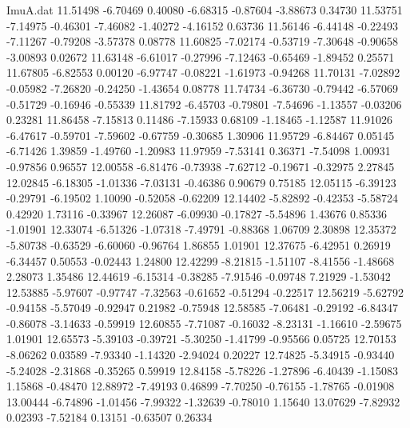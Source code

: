 \begin{filecontents}{ImuA.dat}
  11.51498   -6.70469    0.40080   -6.68315   -0.87604   -3.88673    0.34730
  11.53751   -7.14975   -0.46301   -7.46082   -1.40272   -4.16152    0.63736
  11.56146   -6.44148   -0.22493   -7.11267   -0.79208   -3.57378    0.08778
  11.60825   -7.02174   -0.53719   -7.30648   -0.90658   -3.00893    0.02672
  11.63148   -6.61017   -0.27996   -7.12463   -0.65469   -1.89452    0.25571
  11.67805   -6.82553    0.00120   -6.97747   -0.08221   -1.61973   -0.94268
  11.70131   -7.02892   -0.05982   -7.26820   -0.24250   -1.43654    0.08778
  11.74734   -6.36730   -0.79442   -6.57069   -0.51729   -0.16946   -0.55339
  11.81792   -6.45703   -0.79801   -7.54696   -1.13557   -0.03206    0.23281
  11.86458   -7.15813    0.11486   -7.15933    0.68109   -1.18465   -1.12587
  11.91026   -6.47617   -0.59701   -7.59602   -0.67759   -0.30685    1.30906
  11.95729   -6.84467    0.05145   -6.71426    1.39859   -1.49760   -1.20983
  11.97959   -7.53141    0.36371   -7.54098    1.00931   -0.97856    0.96557
  12.00558   -6.81476   -0.73938   -7.62712   -0.19671   -0.32975    2.27845
  12.02845   -6.18305   -1.01336   -7.03131   -0.46386    0.90679    0.75185
  12.05115   -6.39123   -0.29791   -6.19502    1.10090   -0.52058   -0.62209
  12.14402   -5.82892   -0.42353   -5.58724    0.42920    1.73116   -0.33967
  12.26087   -6.09930   -0.17827   -5.54896    1.43676    0.85336   -1.01901
  12.33074   -6.51326   -1.07318   -7.49791   -0.88368    1.06709    2.30898
  12.35372   -5.80738   -0.63529   -6.60060   -0.96764    1.86855    1.01901
  12.37675   -6.42951    0.26919   -6.34457    0.50553   -0.02443    1.24800
  12.42299   -8.21815   -1.51107   -8.41556   -1.48668    2.28073    1.35486
  12.44619   -6.15314   -0.38285   -7.91546   -0.09748    7.21929   -1.53042
  12.53885   -5.97607   -0.97747   -7.32563   -0.61652   -0.51294   -0.22517
  12.56219   -5.62792   -0.94158   -5.57049   -0.92947    0.21982   -0.75948
  12.58585   -7.06481   -0.29192   -6.84347   -0.86078   -3.14633   -0.59919
  12.60855   -7.71087   -0.16032   -8.23131   -1.16610   -2.59675    1.01901
  12.65573   -5.39103   -0.39721   -5.30250   -1.41799   -0.95566    0.05725
  12.70153   -8.06262    0.03589   -7.93340   -1.14320   -2.94024    0.20227
  12.74825   -5.34915   -0.93440   -5.24028   -2.31868   -0.35265    0.59919
  12.84158   -5.78226   -1.27896   -6.40439   -1.15083    1.15868   -0.48470
  12.88972   -7.49193    0.46899   -7.70250   -0.76155   -1.78765   -0.01908
  13.00444   -6.74896   -1.01456   -7.99322   -1.32639   -0.78010    1.15640
  13.07629   -7.82932    0.02393   -7.52184    0.13151   -0.63507    0.26334

\end{filecontents}
